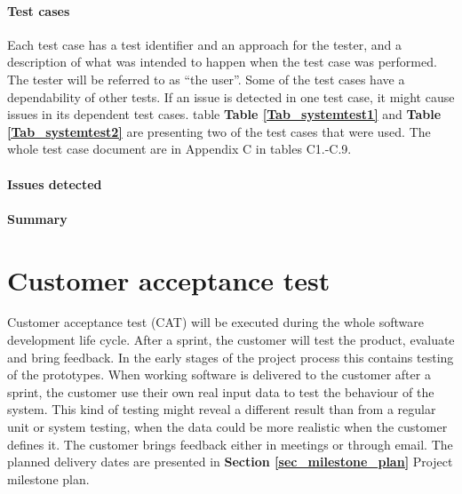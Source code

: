{\paragraph{Test cases}
Each test case has a test identifier and an approach for the tester, and a description of what was intended to happen when the test case was performed. The tester will be referred to as “the user”. 
Some of the test cases have a dependability of other tests. If an issue is detected in one test case, it might cause issues in its dependent test cases. table \textbf{Table \ref{Tab_systemtest1}} and \textbf{Table \ref{Tab_systemtest2}} are presenting two of the test cases that were used. The whole test case document are in Appendix C in tables C1.-C.9. 

\paragraph{Issues detected}

\paragraph{Summary}

\section{Customer acceptance test}
\label{sec_acceptance_test}

Customer acceptance test (CAT) will be executed during the whole software development life cycle. After a sprint, the customer will test the product, evaluate and bring feedback. In the early stages of the project process this contains testing of the prototypes. When working software is delivered to the customer after a sprint, the customer use their own real input data to test the behaviour of the system. This kind of testing might reveal a different result than from a regular unit or system testing, when the data could be more realistic when the customer defines it. The customer brings feedback either in meetings or through email. The planned delivery dates are presented in \textbf{Section \ref{sec_milestone_plan}} Project milestone plan.  

\renewcommand{\arraystretch}{2}%
\begin{center}
	\begin{longtable}{ | p{4cm} | p{13cm} | }
		

\end{longtable}
\end{center}}

